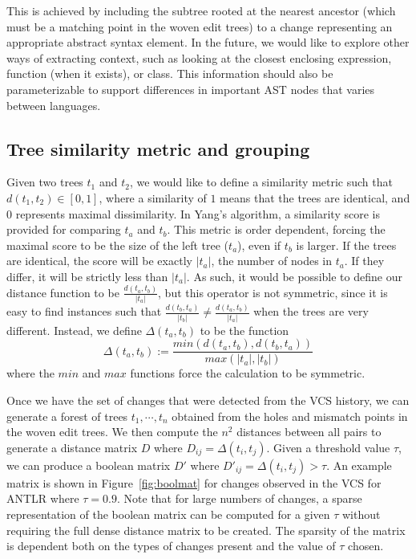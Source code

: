 This is achieved by including the subtree rooted at the nearest ancestor
(which must be a matching point in the woven edit trees) to a change
representing an appropriate abstract syntax element.   In the future, we would
like to explore other ways of extracting context, such as looking at the
closest enclosing expression, function (when it exists), or class.  This
information should also be parameterizable to support differences in important
AST nodes that varies between languages.

\subsection{Tree similarity metric and grouping}

Given two trees $t_1$ and $t_2$, we would like to define a similarity metric
such that $d(t_1, t_2) \in [0,1]$, where a similarity of $1$ means that the
trees are identical, and $0$ represents maximal dissimilarity.  In Yang's
algorithm, a similarity score is provided for comparing $t_a$ and $t_b$. This
metric is order dependent, forcing the maximal score to be the size of the
left tree ($t_a$), even if $t_b$ is larger.  If the trees are identical, the
score will be exactly $|t_a|$, the number of nodes in $t_a$.  If they differ,
it will be strictly less than $|t_a|$.  As such, it would be possible to define
our distance function to be $\frac{d(t_a, t_b)}{|t_a|}$, but this operator is
not symmetric, since it is easy to find instances such that $\frac{d(t_b,
t_a)}{|t_b|} \neq \frac{d(t_a, t_b)}{|t_a|}$ when the trees are very different.
Instead, we define $\Delta(t_a, t_b)$ to be the function
$$\Delta(t_a, t_b) := \frac{min(d(t_a, t_b),d(t_b, t_a))}{max(|t_a|,|t_b|)}$$
where the $min$ and $max$ functions force the calculation to be symmetric.

Once we have the set of changes that were detected from the VCS history, we
can generate a forest of trees $t_1, \cdots, t_n$ obtained from the holes and
mismatch points in the woven edit trees.  We then compute the $n^2$ distances
between all pairs to generate a distance matrix $D$ where $D_{ij} =
\Delta(t_i, t_j)$.  Given a threshold value $\tau$, we can produce a boolean
matrix $D'$ where $D'_{ij} = \Delta(t_i, t_j) > \tau$.  An example matrix is
shown in Figure~\ref{fig:boolmat} for changes observed in the VCS for ANTLR
where $\tau = 0.9$.  Note that for large numbers of changes, a sparse
representation of the boolean matrix can be computed for a given $\tau$
without requiring the full dense distance matrix to be created.  The sparsity
of the matrix is dependent both on the types of changes present and the value
of $\tau$ chosen.  

